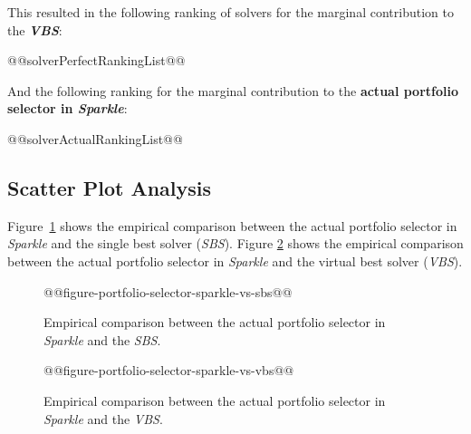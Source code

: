 \documentclass[british]{article}
\newif\iftest
\begin{document}
This resulted in the following ranking of solvers for the marginal contribution to the \textbf{{\em VBS}}:

\begin{enumerate}
@@solverPerfectRankingList@@
\end{enumerate}

And the following ranking for the marginal contribution to the \textbf{actual portfolio selector in \emph{Sparkle}}:

\begin{enumerate} 
@@solverActualRankingList@@
\end{enumerate}


\subsection{Scatter Plot Analysis}

Figure~\ref{fig:sparkle_vs_sbs} shows the empirical comparison between the actual portfolio selector in \emph{Sparkle} and the single best solver (\emph{SBS}).
Figure \ref{fig:sparkle_vs_vbs} shows the empirical comparison between the actual portfolio selector in \emph{Sparkle} and the virtual best solver (\emph{VBS}).

\begin{figure}[htbp]
\noindent \begin{centering}
@@figure-portfolio-selector-sparkle-vs-sbs@@
\par\end{centering}

\caption{Empirical comparison between the actual portfolio selector in \emph{Sparkle} and the \emph{SBS}.}\label{fig:sparkle_vs_sbs}
\end{figure}

\begin{figure}[htbp]
\noindent \begin{centering}
@@figure-portfolio-selector-sparkle-vs-vbs@@
\par\end{centering}

\caption{Empirical comparison between the actual portfolio selector in \emph{Sparkle} and the \emph{VBS}.}\label{fig:sparkle_vs_vbs}
\end{figure}


\iftest
\section{Experimental Results on the Test Set}
\label{sec:Experimental_Results_Test}

In this section, the PAR@@penalty@@ results for the current portfolio selector in \emph{Sparkle} on solving the test instance set @@testInstanceClass@@ is reported.

\begin{itemize}
\item \textbf{Actual Portfolio Selector in \emph{Sparkle}}, PAR@@penalty@@: @@testActualPAR@@
\end{itemize}
\fi




\end{document}
